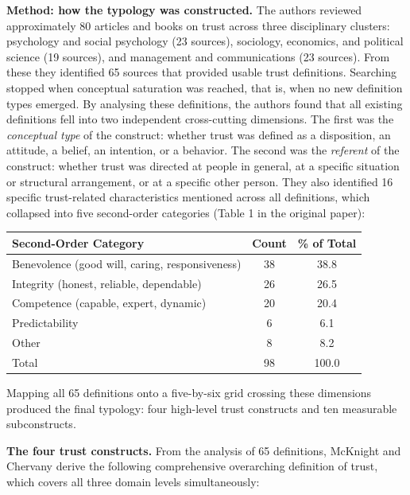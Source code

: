 \documentclass[11pt, a4paper]{article}
\begin{document}
\textbf{Method: how the typology was constructed.} The authors reviewed approximately 80 articles and books on trust across three disciplinary clusters: psychology and social psychology (23 sources), sociology, economics, and political science (19 sources), and management and communications (23 sources). From these they identified 65 sources that provided usable trust definitions. Searching stopped when conceptual saturation was reached, that is, when no new definition types emerged. By analysing these definitions, the authors found that all existing definitions fell into two independent cross-cutting dimensions. The first was the \textit{conceptual type} of the construct: whether trust was defined as a disposition, an attitude, a belief, an intention, or a behavior. The second was the \textit{referent} of the construct: whether trust was directed at people in general, at a specific situation or structural arrangement, or at a specific other person. They also identified 16 specific trust-related characteristics mentioned across all definitions, which collapsed into five second-order categories (Table 1 in the original paper):

\begin{center}
\begin{tabular}{lcc}
\toprule
\textbf{Second-Order Category} & \textbf{Count} & \textbf{\% of Total} \\
\midrule
Benevolence (good will, caring, responsiveness) & 38 & 38.8 \\
Integrity (honest, reliable, dependable) & 26 & 26.5 \\
Competence (capable, expert, dynamic) & 20 & 20.4 \\
Predictability & 6 & 6.1 \\
Other & 8 & 8.2 \\
\midrule
Total & 98 & 100.0 \\
\bottomrule
\end{tabular}
\end{center}

Mapping all 65 definitions onto a five-by-six grid crossing these dimensions produced the final typology: four high-level trust constructs and ten measurable subconstructs.

\textbf{The four trust constructs.} From the analysis of 65 definitions, McKnight and Chervany derive the following comprehensive overarching definition of trust, which covers all three domain levels simultaneously:
\end{document}
